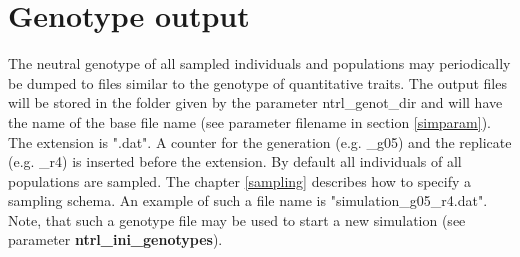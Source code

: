 \documentclass[letterpaper,12pt,oneside]{book}
\begin{document}
\section{Genotype output}\label{genoNTRL}
The neutral genotype of all sampled individuals and populations may periodically be dumped to files similar to the genotype of quantitative traits. The output files will be stored in the folder given by the parameter \textsf{ntrl\_genot\_dir} and will have the name of the base file name (see parameter \textsf{filename} in section \ref{simparam}). The extension is ".dat". A counter for the generation (e.g. \_g05) and the replicate (e.g. \_r4) is inserted before the extension. By default all individuals of all populations are sampled. The chapter \ref{sampling} describes how to specify a sampling schema. An example of such a file name is \textsf{"simulation\_g05\_r4.dat"}. Note, that such a genotype file may be used to start a new simulation (see parameter \textbf{ntrl\_ini\_genotypes}).
\end{document}
